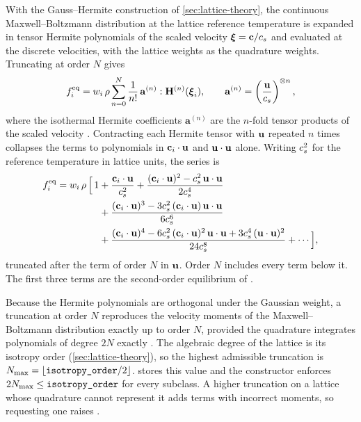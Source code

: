 With the Gauss--Hermite construction of \cref{sec:lattice-theory}, the continuous
Maxwell--Boltzmann distribution at the lattice reference temperature is expanded in tensor
Hermite polynomials of the scaled velocity $\boldsymbol{\xi} = \mathbf{c}/c_s$ and evaluated at the
discrete velocities, with the lattice weights as the quadrature weights. Truncating at order
$N$ gives
\begin{equation}
f^{\mathrm{eq}}_i = w_i\,\rho \sum_{n=0}^{N} \frac{1}{n!}\,
\mathbf{a}^{(n)} : \mathbf{H}^{(n)}(\boldsymbol{\xi}_i),
\qquad \mathbf{a}^{(n)} = \left(\frac{\mathbf{u}}{c_s}\right)^{\otimes n},
\label{eq:hermite-eq}
\end{equation}
where the isothermal Hermite coefficients $\mathbf{a}^{(n)}$ are the $n$-fold tensor products
of the scaled velocity \parencite{Grad1949,ShanYuanChen2006}. Contracting each Hermite
tensor with $\mathbf{u}$ repeated $n$ times collapses the terms to polynomials in
$\mathbf{c}_i\cdot\mathbf{u}$ and $\mathbf{u}\cdot\mathbf{u}$ alone. Writing $c_s^2$ for the reference temperature in
lattice units, the series is
\begin{equation}
\begin{aligned}
f^{\mathrm{eq}}_i = w_i\,\rho\,\Big[\,1
&+ \frac{\mathbf{c}_i\cdot\mathbf{u}}{c_s^2}
 + \frac{(\mathbf{c}_i\cdot\mathbf{u})^2 - c_s^2\,\mathbf{u}\cdot\mathbf{u}}{2c_s^4} \\
&+ \frac{(\mathbf{c}_i\cdot\mathbf{u})^3 - 3c_s^2\,(\mathbf{c}_i\cdot\mathbf{u})\,\mathbf{u}\cdot\mathbf{u}}{6c_s^6} \\
&+ \frac{(\mathbf{c}_i\cdot\mathbf{u})^4 - 6c_s^2\,(\mathbf{c}_i\cdot\mathbf{u})^2\,\mathbf{u}\cdot\mathbf{u}
        + 3c_s^4\,(\mathbf{u}\cdot\mathbf{u})^2}{24c_s^8}
 + \cdots\Big],
\end{aligned}
\label{eq:hermite-terms}
\end{equation}
truncated after the term of order $N$ in $\mathbf{u}$. Order $N$ includes every term below it.
The first three terms are the second-order equilibrium of
\textcite{QianHumieresLallemand1992}.

Because the Hermite polynomials are orthogonal under the Gaussian weight, a truncation at
order $N$ reproduces the velocity moments of the Maxwell--Boltzmann distribution exactly up
to order $N$, provided the quadrature integrates polynomials of degree $2N$ exactly
\parencite{ShanYuanChen2006}. The algebraic degree of the lattice is its isotropy order
(\cref{sec:lattice-theory}), so the highest admissible truncation is
$N_{\max} = \lfloor \texttt{isotropy\_order}/2 \rfloor$. 
stores this value and the constructor enforces $2N_{\max} \le \texttt{isotropy\_order}$ for
every subclass. A higher truncation on a lattice whose quadrature cannot represent it adds
terms with incorrect moments, so requesting one raises .

